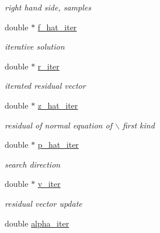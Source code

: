 \begin{CompactItemize}
\begin{CompactList}\small\item\em right hand side, samples \item\end{CompactList}\item 
\hypertarget{structinfst__plan_o5}{
double $\ast$ \hyperlink{structinfst__plan_o5}{f\_\-hat\_\-iter}}
\label{structinfst__plan_o5}

\begin{CompactList}\small\item\em iterative solution \item\end{CompactList}\item 
\hypertarget{structinfst__plan_o6}{
double $\ast$ \hyperlink{structinfst__plan_o6}{r\_\-iter}}
\label{structinfst__plan_o6}

\begin{CompactList}\small\item\em iterated residual vector \item\end{CompactList}\item 
\hypertarget{structinfst__plan_o7}{
double $\ast$ \hyperlink{structinfst__plan_o7}{z\_\-hat\_\-iter}}
\label{structinfst__plan_o7}

\begin{CompactList}\small\item\em residual of normal equation of $\backslash$ first kind \item\end{CompactList}\item 
\hypertarget{structinfst__plan_o8}{
double $\ast$ \hyperlink{structinfst__plan_o8}{p\_\-hat\_\-iter}}
\label{structinfst__plan_o8}

\begin{CompactList}\small\item\em search direction \item\end{CompactList}\item 
\hypertarget{structinfst__plan_o9}{
double $\ast$ \hyperlink{structinfst__plan_o9}{v\_\-iter}}
\label{structinfst__plan_o9}

\begin{CompactList}\small\item\em residual vector update \item\end{CompactList}\item 
\hypertarget{structinfst__plan_o10}{
double \hyperlink{structinfst__plan_o10}{alpha\_\-iter}}
\label{structinfst__plan_o10}


\end{CompactItemize}
